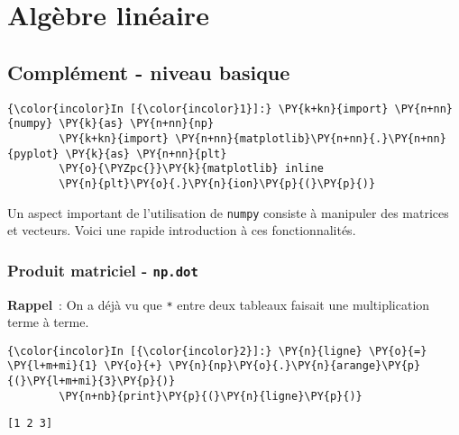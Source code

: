     
    
    
    

    

    \hypertarget{alguxe8bre-linuxe9aire}{%
\section{Algèbre linéaire}\label{alguxe8bre-linuxe9aire}}

    \hypertarget{compluxe9ment---niveau-basique}{%
\subsection{Complément - niveau
basique}\label{compluxe9ment---niveau-basique}}

    \begin{Verbatim}[commandchars=\\\{\}]
{\color{incolor}In [{\color{incolor}1}]:} \PY{k+kn}{import} \PY{n+nn}{numpy} \PY{k}{as} \PY{n+nn}{np}
        \PY{k+kn}{import} \PY{n+nn}{matplotlib}\PY{n+nn}{.}\PY{n+nn}{pyplot} \PY{k}{as} \PY{n+nn}{plt}
        \PY{o}{\PYZpc{}}\PY{k}{matplotlib} inline
        \PY{n}{plt}\PY{o}{.}\PY{n}{ion}\PY{p}{(}\PY{p}{)}
\end{Verbatim}


    Un aspect important de l'utilisation de \texttt{numpy} consiste à
manipuler des matrices et vecteurs. Voici une rapide introduction à ces
fonctionnalités.

    \hypertarget{produit-matriciel---np.dot}{%
\subsubsection{\texorpdfstring{Produit matriciel -
\texttt{np.dot}}{Produit matriciel - np.dot}}\label{produit-matriciel---np.dot}}

    \textbf{Rappel}~: On a déjà vu que \texttt{*} entre deux tableaux
faisait une multiplication terme à terme.

    \begin{Verbatim}[commandchars=\\\{\}]
{\color{incolor}In [{\color{incolor}2}]:} \PY{n}{ligne} \PY{o}{=} \PY{l+m+mi}{1} \PY{o}{+} \PY{n}{np}\PY{o}{.}\PY{n}{arange}\PY{p}{(}\PY{l+m+mi}{3}\PY{p}{)}
        \PY{n+nb}{print}\PY{p}{(}\PY{n}{ligne}\PY{p}{)}
\end{Verbatim}


    \begin{Verbatim}[commandchars=\\\{\}]
[1 2 3]

    \end{Verbatim}

